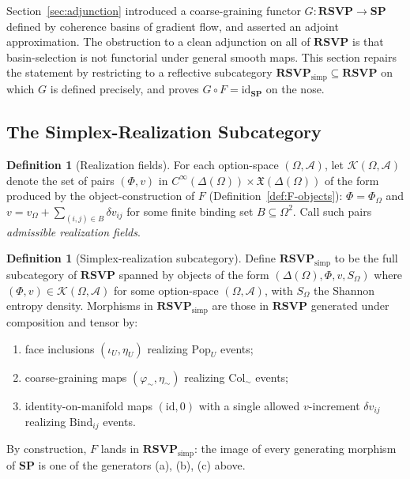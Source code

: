 \documentclass[12pt,a4paper]{article}
\theoremstyle{definition}
\newtheorem{definition}[theorem]{Definition}
\theoremstyle{remark}
\newcommand{\SP}{\mathbf{SP}}
\newcommand{\RSVP}{\mathbf{RSVP}}
\providecommand{\id}{\mathrm{id}}
\renewcommand{\id}{\mathrm{id}}
\newcommand{\Pop}{\ensuremath{\mathrm{Pop}}}
\newcommand{\Bind}{\ensuremath{\mathrm{Bind}}}
\newcommand{\Col}{\ensuremath{\mathrm{Col}}}
\begin{document}
Section~\ref{sec:adjunction} introduced a coarse-graining functor $G:\RSVP\to\SP$
defined by coherence basins of gradient flow, and asserted an adjoint approximation.
The obstruction to a clean adjunction on all of $\RSVP$ is that basin-selection is
not functorial under general smooth maps. This section repairs the statement by
restricting to a reflective subcategory $\RSVP_{\mathrm{simp}}\subseteq\RSVP$ on
which $G$ is defined precisely, and proves $G\circ F=\id_{\SP}$ on the nose.

\subsection{The Simplex-Realization Subcategory}

\begin{definition}[Realization fields]
\label{def:real-fields}
For each option-space $(\Omega,\mathcal{A})$, let $\mathcal{K}(\Omega,\mathcal{A})$
denote the set of pairs $(\Phi,v)$ in $C^\infty(\Delta(\Omega))\times\mathfrak{X}
(\Delta(\Omega))$ of the form produced by the object-construction of $F$
(Definition~\ref{def:F-objects}): $\Phi=\Phi_\Omega$ and $v=v_\Omega+\sum_{(i,j)\in B}
\delta v_{ij}$ for some finite binding set $B\subseteq\Omega^2$. Call such pairs
\emph{admissible realization fields}.
\end{definition}

\begin{definition}[Simplex-realization subcategory]
\label{def:rsvp-simp}
Define $\RSVP_{\mathrm{simp}}$ to be the full subcategory of $\RSVP$ spanned by
objects of the form $(\Delta(\Omega),\Phi,v,S_\Omega)$ where $(\Phi,v)\in
\mathcal{K}(\Omega,\mathcal{A})$ for some option-space $(\Omega,\mathcal{A})$,
with $S_\Omega$ the Shannon entropy density. Morphisms in $\RSVP_{\mathrm{simp}}$
are those in $\RSVP$ generated under composition and tensor by:
\begin{enumerate}[label=(\alph*)]
  \item face inclusions $(\iota_U,\eta_U)$ realizing $\Pop_U$ events;
  \item coarse-graining maps $(\varphi_\sim,\eta_\sim)$ realizing $\Col_\sim$ events;
  \item identity-on-manifold maps $(\id,0)$ with a single allowed $v$-increment
    $\delta v_{ij}$ realizing $\Bind_{ij}$ events.
\end{enumerate}
\end{definition}

By construction, $F$ lands in $\RSVP_{\mathrm{simp}}$: the image of every generating
morphism of $\SP$ is one of the generators (a), (b), (c) above.
\end{document}
